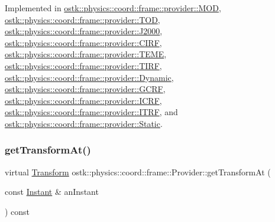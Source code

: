 Implemented in \hyperlink{classostk_1_1physics_1_1coord_1_1frame_1_1provider_1_1_m_o_d_ac7d8c3c340359b0bf13728aa93d285e4}{ostk\+::physics\+::coord\+::frame\+::provider\+::\+M\+OD}, \hyperlink{classostk_1_1physics_1_1coord_1_1frame_1_1provider_1_1_t_o_d_ad374cdce01f5872311b61695502dd4e4}{ostk\+::physics\+::coord\+::frame\+::provider\+::\+T\+OD}, \hyperlink{classostk_1_1physics_1_1coord_1_1frame_1_1provider_1_1_j2000_ab4ec150d7b6c0e38691f3dcb4dfd74c9}{ostk\+::physics\+::coord\+::frame\+::provider\+::\+J2000}, \hyperlink{classostk_1_1physics_1_1coord_1_1frame_1_1provider_1_1_c_i_r_f_a9c7c1e79785b676501e6a4686389a425}{ostk\+::physics\+::coord\+::frame\+::provider\+::\+C\+I\+RF}, \hyperlink{classostk_1_1physics_1_1coord_1_1frame_1_1provider_1_1_t_e_m_e_a10031d843340adafe7d9f4a3a0a4f86c}{ostk\+::physics\+::coord\+::frame\+::provider\+::\+T\+E\+ME}, \hyperlink{classostk_1_1physics_1_1coord_1_1frame_1_1provider_1_1_t_i_r_f_ae29e3db5bd1bccbc69a507f8716b73e5}{ostk\+::physics\+::coord\+::frame\+::provider\+::\+T\+I\+RF}, \hyperlink{classostk_1_1physics_1_1coord_1_1frame_1_1provider_1_1_dynamic_a37623142581671606ea45ca3bda0d0c8}{ostk\+::physics\+::coord\+::frame\+::provider\+::\+Dynamic}, \hyperlink{classostk_1_1physics_1_1coord_1_1frame_1_1provider_1_1_g_c_r_f_a71f14cba2d0d20a5bbeaa3b4fb08a79a}{ostk\+::physics\+::coord\+::frame\+::provider\+::\+G\+C\+RF}, \hyperlink{classostk_1_1physics_1_1coord_1_1frame_1_1provider_1_1_i_c_r_f_a40f7812d39719db68178ab6850a5cdde}{ostk\+::physics\+::coord\+::frame\+::provider\+::\+I\+C\+RF}, \hyperlink{classostk_1_1physics_1_1coord_1_1frame_1_1provider_1_1_i_t_r_f_aad7e29329b68f264bed571bf48b902a4}{ostk\+::physics\+::coord\+::frame\+::provider\+::\+I\+T\+RF}, and \hyperlink{classostk_1_1physics_1_1coord_1_1frame_1_1provider_1_1_static_a3e25a6fc979fc4ac28d8cbea4835ea71}{ostk\+::physics\+::coord\+::frame\+::provider\+::\+Static}.

\mbox{\label{classostk_1_1physics_1_1coord_1_1frame_1_1_provider_a38b86a589f46f8b8a9c97ab2776f37d1}} 
\subsubsection{\texorpdfstring{get\+Transform\+At()}{getTransformAt()}}
{\footnotesize\ttfamily virtual \hyperlink{classostk_1_1physics_1_1coord_1_1_transform}{Transform} ostk\+::physics\+::coord\+::frame\+::\+Provider\+::get\+Transform\+At (\begin{DoxyParamCaption}\item[{const \hyperlink{classostk_1_1physics_1_1time_1_1_instant}{Instant} \&}]{an\+Instant }\end{DoxyParamCaption}) const\hspace{0.3cm}{\ttfamily [pure virtual]}}




